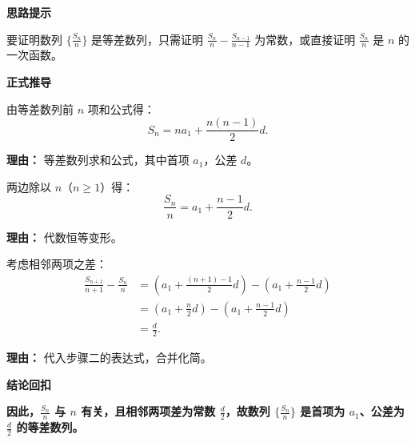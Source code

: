 \begin{proofbox}
	\textbf{\textcolor{CProof}{思路提示}}

	要证明数列 $\{\frac{S_n}{n}\}$ 是等差数列，只需证明 $\frac{S_{n}}{n} - \frac{S_{n-1}}{n-1}$ 为常数，或直接证明 $\frac{S_n}{n}$ 是 $n$ 的一次函数。

	\medskip
	\textbf{\textcolor{CProof}{正式推导}}
	\begin{description}[style=nextline, leftmargin=2.8em, labelsep=0.5em, itemsep=0.55em]
		\item[\textbf{步骤一（求和公式）：}] 由等差数列前 $n$ 项和公式得：
			\[
				S_n = n a_1 + \frac{n(n-1)}{2}d.
			\]
			\par\textbf{理由：} 等差数列求和公式，其中首项 $a_1$，公差 $d$。

		\item[\textbf{步骤二（平均表达式）：}] 两边除以 $n$（$n\ge 1$）得：
			\[
				\frac{S_n}{n} = a_1 + \frac{n-1}{2}d.
			\]
			\par\textbf{理由：} 代数恒等变形。

		\item[\textbf{步骤三（差值验证）：}] 考虑相邻两项之差：
			\[
				\begin{aligned}
					\frac{S_{n+1}}{n+1} - \frac{S_n}{n}
					&= \left( a_1 + \frac{(n+1)-1}{2}d \right) - \left( a_1 + \frac{n-1}{2}d \right) \\
					&= \left( a_1 + \frac{n}{2}d \right) - \left( a_1 + \frac{n-1}{2}d \right) \\
					&= \frac{d}{2}.
			\end{aligned}
			\]
			\par\textbf{理由：} 代入步骤二的表达式，合并化简。
	\end{description}

	\medskip
	\textbf{\textcolor{CProof}{结论回扣}}

	\textbf{因此，$\frac{S_n}{n}$ 与 $n$ 有关，且相邻两项差为常数 $\frac{d}{2}$，故数列 $\{\frac{S_n}{n}\}$ 是首项为 $a_1$、公差为 $\frac{d}{2}$ 的等差数列。}
\end{proofbox}
